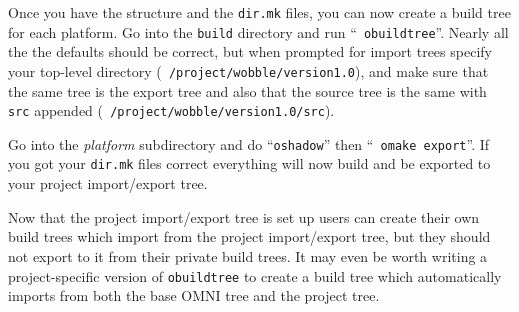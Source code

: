 \documentclass[11pt]{article}
\begin{document}
Once you have the structure and the {\tt dir.mk} files, you can now create a
build tree for each platform.  Go into the {\tt build} directory and run ``{\tt
obuildtree}''.  Nearly all the the defaults should be correct, but when
prompted for import trees specify your top-level directory ({\tt
/project/wobble/version1.0}), and make sure that the same tree is the export
tree and also that the source tree is the same with {\tt src} appended ({\tt
/project/wobble/version1.0/src}).

Go into the {\it platform} subdirectory and do ``{\tt oshadow}'' then ``{\tt
omake export}''.  If you got your {\tt dir.mk} files correct everything will
now build and be exported to your project import/export tree.

Now that the project import/export tree is set up users can create their own
build trees which import from the project import/export tree, but they should
not export to it from their private build trees.  It may even be worth writing
a project-specific version of {\tt obuildtree} to create a build tree which
automatically imports from both the base OMNI tree and the project tree.
\end{document}
